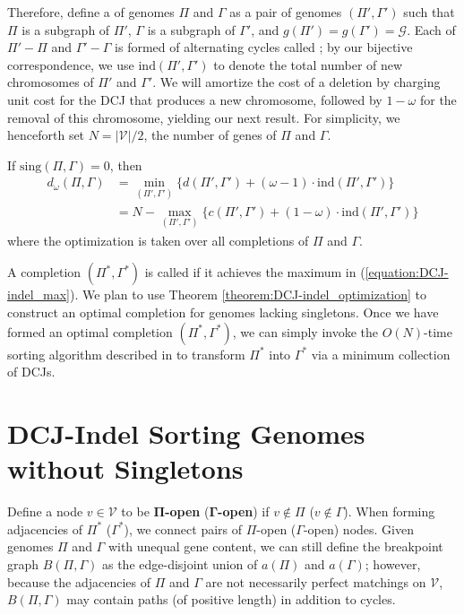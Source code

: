 Therefore, define a  of genomes $\Pi$ and $\Gamma$ as a pair of genomes $(\Pi', \Gamma')$ such that $\Pi$ is a subgraph of $\Pi'$, $\Gamma$ is a subgraph of $\Gamma'$, and $g(\Pi') = g(\Gamma') = \mathcal{G}$.  Each of $\Pi' - \Pi$ and $\Gamma' - \Gamma$ is formed of alternating cycles called ; by our bijective correspondence, we use $\mathrm{ind}(\Pi', \Gamma')$ to denote the total number of new chromosomes of $\Pi'$ and $\Gamma'$.   We will amortize the cost of a deletion by charging unit cost for the DCJ that produces a new chromosome, followed by $1 - \omega$ for the removal of this chromosome, yielding our next result.  For simplicity, we henceforth set $N = |\mathcal{V}|/2$, the number of genes of $\Pi$ and $\Gamma$.

\begin{theorem}
If $\mathrm{sing}(\Pi, \Gamma) = 0$, then
\begin{align}
d_{\omega}(\Pi, \Gamma) & = \min_{(\Pi', \Gamma')}{\{d(\Pi', \Gamma') + (\omega - 1)\cdot \mathrm{ind}(\Pi', \Gamma')\}} \label{equation:DCJ-indel_min} \\
 & = N - \max_{(\Pi', \Gamma')}{\{c(\Pi', \Gamma') + (1 - \omega)\cdot \mathrm{ind}(\Pi', \Gamma')\}} \label{equation:DCJ-indel_max}
\end{align}
where the optimization is taken over all completions of $\Pi$ and $\Gamma$. 
\label{theorem:DCJ-indel_optimization}
\end{theorem}

\noindent A completion $(\Pi^{*}, \Gamma^{*})$ is called  if it achieves the maximum in (\ref{equation:DCJ-indel_max}).  We plan to use Theorem \ref{theorem:DCJ-indel_optimization} to construct an optimal completion for genomes lacking singletons.  Once we have formed an optimal completion $(\Pi^*, \Gamma^*)$, we can simply invoke the $O(N)$-time sorting algorithm described in \cite{bergeron} to transform $\Pi^*$ into $\Gamma^*$ via a minimum collection of DCJs.

\section{DCJ-Indel Sorting Genomes without Singletons}

Define a node $v \in \mathcal{V}$ to be $\mathbf{\Pi}$\textbf{-open} ($\mathbf{\Gamma}$\textbf{-open}) if $v \notin \Pi$ ($v \notin \Gamma$).  When forming adjacencies of $\Pi^{*}$ ($\Gamma^{*}$), we connect pairs of $\Pi$-open ($\Gamma$-open) nodes.   Given genomes $\Pi$ and $\Gamma$ with unequal gene content, we can still define the breakpoint graph $B(\Pi, \Gamma)$ as the edge-disjoint union of $a(\Pi)$ and $a(\Gamma)$; however, because the adjacencies of $\Pi$ and $\Gamma$ are not necessarily perfect matchings on $\mathcal{V}$, $B(\Pi, \Gamma)$ may contain paths (of positive length) in addition to cycles.  

